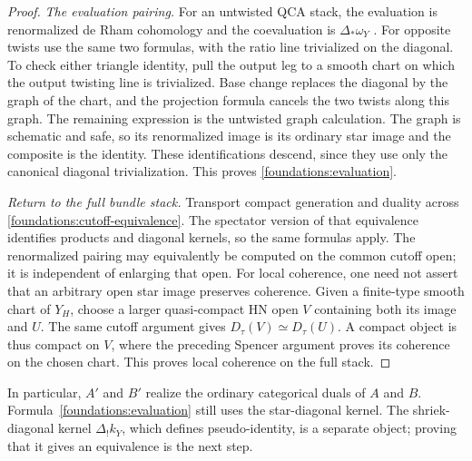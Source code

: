 \begin{proof}
\emph{The evaluation pairing.}
For an untwisted QCA stack, the evaluation is renormalized de Rham
cohomology and the coevaluation is $\Delta_*\omega_Y$
\cite[Sections~8.4 and~9.1]{DrinfeldGaitsgoryFiniteness}.
For opposite twists use the same two formulas, with the ratio line
trivialized on the diagonal.  To check either triangle identity, pull
the output leg to a smooth chart on which the output twisting line is
trivialized.  Base change replaces the diagonal by the graph of the
chart, and the projection formula cancels the two twists along this
graph.  The remaining expression is the untwisted graph calculation.
The graph is schematic and safe, so its renormalized image is its
ordinary star image and the composite is the identity.  These
identifications descend, since they use only the canonical diagonal
trivialization.  This proves \eqref{foundations:evaluation}.

\emph{Return to the full bundle stack.}
Transport compact generation and duality across
\eqref{foundations:cutoff-equivalence}.  The spectator version of that
equivalence identifies products and diagonal kernels, so the same
formulas apply.  The renormalized pairing may equivalently be computed
on the common cutoff open; it is independent of enlarging that open.
For local coherence, one need not assert that an arbitrary open star
image preserves coherence.  Given a finite-type smooth chart of $Y_H$,
choose a larger quasi-compact HN open $V$ containing both its image and
$U$.  The same cutoff argument gives $D_\tau(V)\simeq D_\tau(U)$.
A compact object is thus compact on $V$, where the preceding Spencer
argument proves its coherence on the chosen chart.  This proves local
coherence on the full stack.
\end{proof}

In particular, $A'$ and $B'$ realize the ordinary categorical duals of
$A$ and $B$.  Formula~\eqref{foundations:evaluation} still uses the
star-diagonal kernel.  The shriek-diagonal kernel
$\Delta_!k_Y$, which defines pseudo-identity, is a separate object;
proving that it gives an equivalence is the next step.
